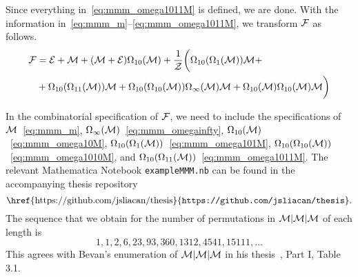 \documentclass[12pt, a4paper, twoside]{report}
\begin{document}
Since everything in~\eqref{eq:mmm_omega1011M} is defined, we are done. With the information in~\eqref{eq:mmm_m}--\eqref{eq:mmm_omega1011M}, we transform $\mathcal{F}$ as follows.
\begin{align*}
  \mathcal{F} &= \mathcal{E} + \mathcal{M} + (\mathcal{M} + \mathcal{E})\Omega_{10}(\mathcal{M}) +\frac{1}{\mathcal{Z}}\bigg(\Omega_{10}(\Omega_1(\mathcal{M}))\mathcal{M} +\\
     &+\Omega_{10}(\Omega_{11}(\mathcal{M}))\mathcal{M} +\Omega_{10}(\Omega_{10}(\mathcal{M}))\Omega_\infty(\mathcal{M})\mathcal{M} + \Omega_{10}(\mathcal{M})\Omega_{10}(\mathcal{M})\mathcal{M}\bigg)
\end{align*}

In the combinatorial specification of $\mathcal{F}$, we need to include the specifications of $\mathcal{M}$~\eqref{eq:mmm_m}, $\Omega_\infty(\mathcal{M})$~\eqref{eq:mmm_omegainfty}, $\Omega_{10}(\mathcal{M})$~\eqref{eq:mmm_omega10M}, $\Omega_{10}(\Omega_1(\mathcal{M}))$~\eqref{eq:mmm_omega101M}, $\Omega_{10}(\Omega_{10}(\mathcal{M}))$~\eqref{eq:mmm_omega1010M}, and $\Omega_{10}(\Omega_{11}(\mathcal{M}))$~\eqref{eq:mmm_omega1011M}. The relevant Mathematica Notebook \texttt{exampleMMM.nb} can be found in the accompanying thesis repository $$\text{\href{https://github.com/jsliacan/thesis}{\texttt{https://github.com/jsliacan/thesis}}}.$$
The sequence that we obtain for the number of permutations in $\mathcal{M}|\mathcal{M}|\mathcal{M}$ of each length is $$1,1,2,6,23,93,360,1312,4541,15111,\ldots$$
This agrees with Bevan's enumeration of $\mathcal{M}|\mathcal{M}|\mathcal{M}$ in his thesis~\cite{bevan2015thesis}, Part I, Table 3.1.
\end{document}
